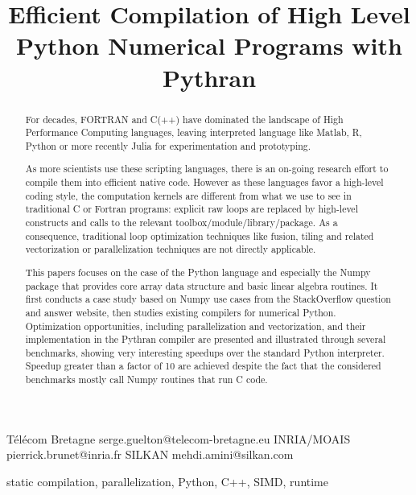 \documentclass[10pt, preprint]{sigplanconf}
\begin{document}
\title{Efficient Compilation of High Level Python Numerical Programs with Pythran}

           {T{\'e}l{\'e}com Bretagne}
           {serge.guelton@telecom-bretagne.eu}
           {INRIA/MOAIS}
           {pierrick.brunet@inria.fr}
           {SILKAN}
           {mehdi.amini@silkan.com}

\maketitle

\begin{abstract}

    For decades, FORTRAN and C(++) have dominated the landscape of High
    Performance Computing languages, leaving interpreted language like Matlab,
    R, Python or more recently Julia for experimentation and prototyping.

    As more scientists use these scripting languages, there is an on-going
    research effort to compile them into efficient native code. However as
    these languages favor a high-level coding style, the computation kernels are
    different from what we use to see in traditional C or Fortran programs:
    explicit raw loops are replaced by high-level constructs and calls to the
    relevant toolbox/module/library/package. As a consequence, traditional
    loop optimization techniques like fusion, tiling and related
    vectorization or parallelization techniques are not directly applicable.

    This papers focuses on the case of the Python language and especially the
    Numpy package that provides core array data structure and basic linear
    algebra routines. It first conducts a case study based on Numpy use
    cases from the StackOverflow question and answer website, then studies
    existing compilers for numerical Python. Optimization opportunities,
    including parallelization and vectorization, and their implementation in
    the Pythran compiler are presented and illustrated through several
    benchmarks, showing very interesting speedups over the standard Python
    interpreter. Speedup greater than a factor of 10 are achieved despite the
    fact that the considered benchmarks mostly call Numpy routines that run C code.

\end{abstract}


\keywords
static compilation, parallelization, Python, C++, SIMD, runtime
\end{document}
